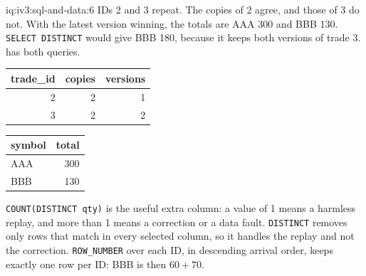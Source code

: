 \begin{solution}{iq:iv3:sql-and-data:6}
IDs 2 and 3 repeat. The copies of 2 agree, and those of 3 do not. With the latest version winning, the totals are AAA 300 and BBB 130. \texttt{SELECT DISTINCT} would give BBB 180, because it keeps both versions of trade 3.  has both queries.
\label{lst:iv3:sq:dup}
\begin{center}\small
\begin{tabular}{rrr}
trade\_id & copies & versions\\\hline
2 & 2 & 1\\
3 & 2 & 2
\end{tabular}\qquad
\begin{tabular}{lr}
symbol & total\\\hline
AAA & 300\\
BBB & 130
\end{tabular}
\end{center}
\texttt{COUNT(DISTINCT qty)} is the useful extra column: a value of 1 means a harmless replay, and more than 1 means a correction or a data fault. \texttt{DISTINCT} removes only rows that match in every selected column, so it handles the replay and not the correction. \texttt{ROW\_NUMBER} over each ID, in descending arrival order, keeps exactly one row per ID: BBB is then $60 + 70$.

\end{solution}

